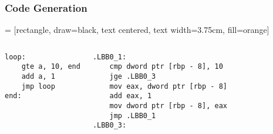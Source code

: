 \documentclass{beamer}
\begin{document}
    \begin{frame}[fragile]
        \frametitle{Code Generation}

         = [rectangle, draw=black, text centered, text width=3.75cm, fill=orange]
        \begin{figure}
        \end{figure}

        \begin{columns}
            \pause
            \begin{lstlisting}[]
loop:
    gte a, 10, end
    add a, 1
    jmp loop
end:
            \end{lstlisting}
            \pause
            \begin{lstlisting}[]
.LBB0_1:
    cmp dword ptr [rbp - 8], 10
    jge .LBB0_3
    mov eax, dword ptr [rbp - 8]
    add eax, 1
    mov dword ptr [rbp - 8], eax
    jmp .LBB0_1
.LBB0_3:
            \end{lstlisting}
        \end{columns}
    \end{frame}
\end{document}
